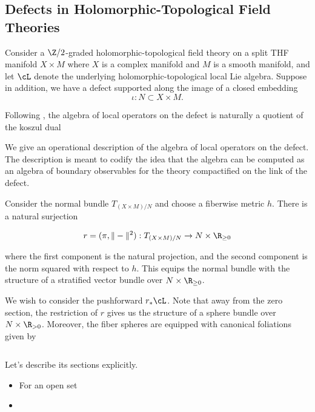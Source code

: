\subsection{Defects in Holomorphic-Topological Field Theories}

\parsec

Consider a $\Z/2$-graded holomorphic-topological field theory on a split THF manifold $X\times M$ where $X$ is a complex manifold and $M$ is a smooth manifold, and let $\cL$ denote the underlying holomorphic-topological local Lie algebra. Suppose in addition, we have a  defect supported along the image of a closed embedding \[\iota : N\subset X\times M.\]


\parsec

Following \cite{PW}, the algebra of local operators on the defect is naturally a quotient of the koszul dual

\parsec

We give an operational description of the algebra of local operators on the defect. The description is meant to codify the idea that the algebra can be computed as an algebra of boundary observables for the theory compactified on the link of the defect.

Consider the normal bundle $T_{(X\times M)/N}$ and choose a fiberwise metric $h$. There is a natural surjection

\[r = (\pi, \|-\|^{2}): T_{(X\times M)/N}\to N \times \R_{\geq 0}\]

where the first component is the natural projection, and the second component is the norm squared with respect to $h$. This equips the normal bundle with the structure of a stratified vector bundle over $N\times \R_{\geq 0}$.

We wish to consider the pushforward $r_{*}\cL$. Note that away from the zero section, the restriction of $r$ gives us the structure of a sphere bundle over $N\times \R_{>0}$. Moreover, the fiber spheres are equipped with canonical foliations given by

\[\]

Let's describe its sections explicitly.

\begin{itemize}
  \item For an open set
  \item
\end{itemize}
